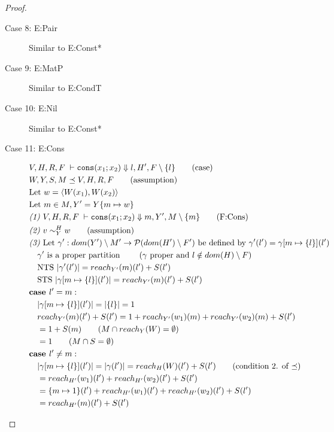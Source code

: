\documentclass{easychair}
\newcommand{\veq}[4]{#3 \sim^{#1}_{#2} #4}
\theoremstyle{definition}
\begin{document}
\begin{proof}
\begin{description}
	\item[Case 8: E:Pair]
  Similar to E:Const*
  \item[Case 9: E:MatP]
  Similar to E:CondT
  \item[Case 10: E:Nil]
  Similar to E:Const*
  \item[Case 11: E:Cons]
  \begin{align*}
		&V,H,R,F \; \vdash \consexcst{x_1}{x_2} \Downarrow l,H' ,F \setminus \{l\} \tag{case}\\
		&W,Y,S,M \preceq V,H,R,F \tag{assumption}\\
		&\text{Let } w = \pairexcst{W(x_1)}{W(x_2)}\\
		&\text{Let } m \in M, Y' = Y\{m \mapsto w\}\\
		&\emph{(1) }V,H,R,F \; \vdash
			\consexcst{x_1}{x_2} \Downarrow m,Y' ,M \setminus \{m\} \tag{F:Cons}\\
		&\emph{(2) } \veq{H}{Y}{v}{w} \tag{assumption}\\
		&\emph{(3) } \text{Let } \gamma' : dom(Y') \setminus M' \to \mathcal{P}(dom(H')\setminus F')
			\text{ be defined by } \gamma'(l') = \gamma[m \mapsto \{l\}](l')\\
		&\quad \gamma' \text{ is a proper partition } 
			\tag{$\gamma$ proper and $l \notin dom(H) \setminus F$}\\
		&\quad \text{NTS } |\gamma'(l')| = reach_{Y'}(m)(l') + S(l')\\
		&\quad \text{STS } |\gamma[m \mapsto \{l\}](l')| = 
			reach_{Y'}(m)(l') + S(l')\\
		&\textbf{case } l' = m:\\
		&\quad |\gamma[m \mapsto \{l\}](l')| = |\{l\}| = 1\\
		&\quad 	reach_{Y'}(m)(l') + S(l') = 1 + reach_{Y'}(w_1)(m) + reach_{Y'}(w_2)(m) + S(l')\\
		&\quad = 1 + S(m) \tag{$M \cap reach_{Y}(W) = \emptyset$}\\
		&\quad = 1 \tag{$M \cap S = \emptyset$}\\
		&\textbf{case } l' \ne m:\\
		&\quad |\gamma[m \mapsto \{l\}](l')| = |\gamma(l')| = reach_H(W)(l') + S(l') 
			\tag{condition 2. of $\preceq$}\\
		&\quad = reach_{H'}(w_1)(l') + reach_{H'}(w_2)(l') + S(l')\\
		&\quad = \{m \mapsto 1\}(l') + reach_{H'}(w_1)(l') + reach_{H'}(w_2)(l') + S(l')\\
		&\quad = reach_{H'}(m)(l') + S(l')\\

\end{align*}
\end{description}
\end{proof}
\end{document}
